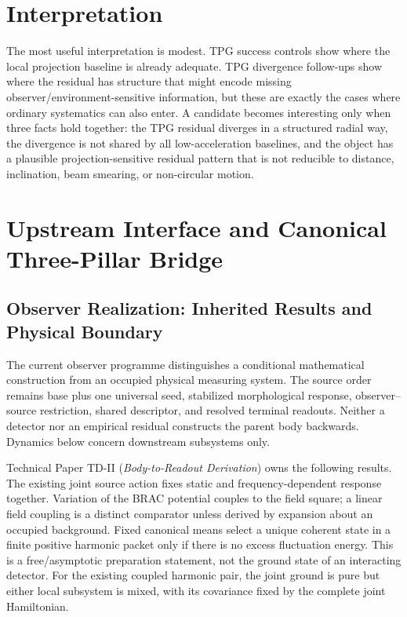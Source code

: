 \documentclass[11pt]{article}
\begin{document}
\section{Interpretation}

The most useful interpretation is modest. TPG success controls show where the local projection baseline is already adequate. TPG divergence follow-ups show where the residual has structure that might encode missing observer/environment-sensitive information, but these are exactly the cases where ordinary systematics can also enter. A candidate becomes interesting only when three facts hold together: the TPG residual diverges in a structured radial way, the divergence is not shared by all low-acceleration baselines, and the object has a plausible projection-sensitive residual pattern that is not reducible to distance, inclination, beam smearing, or non-circular motion.

\section{Upstream Interface and Canonical Three-Pillar Bridge}
\label{sec:upstream-interface}

\subsection{Observer Realization: Inherited Results and Physical Boundary}
\label{sec:observer-update-20260914}
The current observer programme distinguishes a conditional mathematical
construction from an occupied physical measuring system. The source order
remains base plus one universal seed, stabilized morphological response,
observer--source restriction, shared descriptor, and resolved terminal
readouts. Neither a detector nor an empirical residual constructs the parent
body backwards. Dynamics below concern downstream subsystems only.

Technical Paper TD-II (\emph{Body-to-Readout Derivation}) owns the following
results. The existing joint source action fixes static and frequency-dependent
response together. Variation of the BRAC potential couples to the field
square; a linear field coupling is a distinct comparator unless derived by
expansion about an occupied background. Fixed canonical means select a unique
coherent state in a finite positive harmonic packet only if there is no excess
fluctuation energy. This is a free/asymptotic preparation statement, not the
ground state of an interacting detector. For the existing coupled harmonic
pair, the joint ground is pure but either local subsystem is mixed, with its
covariance fixed by the complete joint Hamiltonian.
\end{document}
